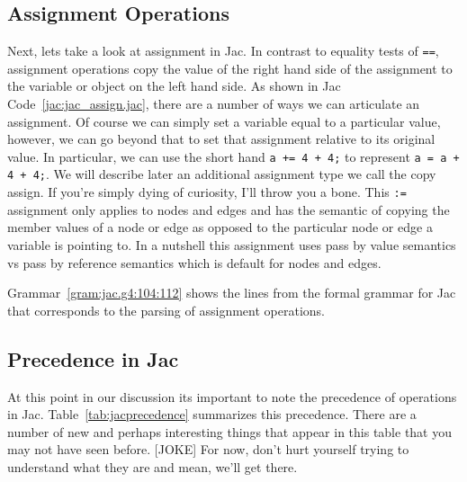 \subsection{Assignment Operations}
Next, lets take a look at assignment in Jac. In contrast to equality tests of \texttt{==}, assignment operations copy the value of the right hand side of the assignment to the variable or object on the left hand side.
As shown in Jac Code~\ref{jac:jac_assign.jac}, there are a number of ways we can articulate an assignment. Of course we can simply set a variable equal to a particular value, however, we can go beyond that to set that assignment relative to its original value. In particular, we can use the short hand \texttt{a += 4 + 4;} to represent \texttt{a = a + 4 + 4;}. We will describe later an additional assignment type we call the copy assign. If you're simply dying of curiosity, I'll throw you a bone. This \texttt{:=} assignment only applies to nodes and edges and has the semantic of copying the member values of a node or edge as opposed to the particular node or edge a variable is pointing to. In a nutshell this assignment uses pass by value semantics vs pass by reference semantics which is default for nodes and edges.

\begin{nerd}
    Grammar~\ref{gram:jac.g4:104:112} shows the lines from the formal grammar for Jac that corresponds to the parsing of assignment operations.
\end{nerd}



\subsection{Precedence in Jac}
\printtabPrecedence
At this point in our discussion its important to note the precedence of operations in Jac. Table~\ref{tab:jacprecedence} summarizes this precedence. There are a number of new and perhaps interesting things that appear in this table that you may not have seen before. [JOKE] For now, don't hurt yourself trying to understand what they are and mean, we'll get there.



